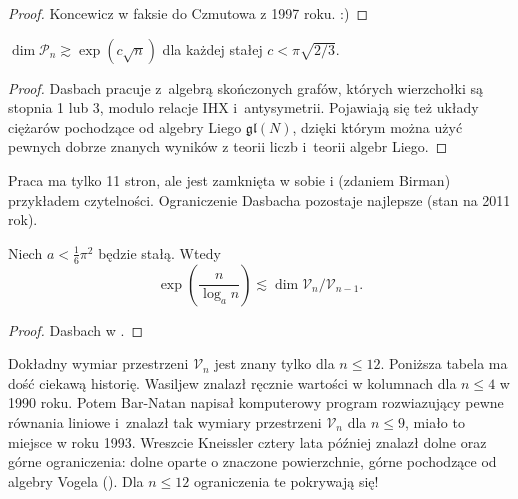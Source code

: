 \begin{proof}
%
%
    Koncewicz w faksie do Czmutowa z 1997 roku. :)
\end{proof}

\begin{proposition}
    $\dim \mathcal P_n \gtrsim \exp (c \sqrt{n})$ dla każdej stałej $c < \pi \sqrt{2/3}$.
\end{proposition}

\begin{proof}
%
    Dasbach \cite{dasbach00} pracuje z~algebrą skończonych grafów, których wierzchołki są stopnia 1 lub 3, modulo relacje IHX i~antysymetrii.
    Pojawiają się też układy ciężarów pochodzące od algebry Liego $\mathfrak{gl}(N)$, dzięki którym można użyć pewnych dobrze znanych wyników z teorii liczb i~teorii algebr Liego.
\end{proof}

Praca \cite{dasbach00} ma tylko 11 stron, ale jest zamknięta w sobie i (zdaniem Birman) przykładem czytelności.
Ograniczenie Dasbacha pozostaje najlepsze (stan na 2011 rok).

\begin{corollary}
    Niech $a < \frac 1 6 \pi^2$ będzie stałą.
    Wtedy
    \begin{equation}
        \exp \left(\frac {n}{\log_a n} \right) \lesssim \dim \mathcal V_n / \mathcal V_{n-1}.
    \end{equation}
\end{corollary}

\begin{proof}
%
    Dasbach w \cite{dasbach00}.
\end{proof}

Dokładny wymiar przestrzeni $\mathcal V_n$ jest znany tylko dla $n \le 12$.
Poniższa tabela ma dość ciekawą historię.
Wasiljew znalazł ręcznie wartości w kolumnach dla $n \le 4$ w 1990 roku.
%
Potem Bar-Natan napisał komputerowy program rozwiazujący pewne równania liniowe i~znalazł tak wymiary przestrzeni $\mathcal V_n$ dla $n \le 9$, miało to miejsce w roku 1993.
%
Wreszcie Kneissler cztery lata później znalazł dolne oraz górne ograniczenia: dolne oparte o znaczone powierzchnie, górne pochodzące od algebry Vogela (\cite{kneissler97}).
%
%
Dla $n \le 12$ ograniczenia te pokrywają się!

